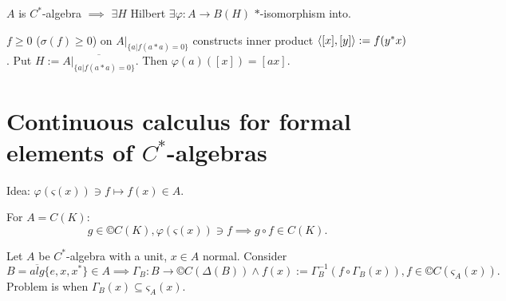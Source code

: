 \documentclass[12pt]{article}					%
\begin{document}
\begin{poznamka}
	$A$ is $C^*$-algebra $\implies$ $\exists H$ Hilbert $\exists φ: A \rightarrow B(H)$ $*$-isomorphism into.

	\begin{dukazin}[Sketch]
		$f ≥ 0$ ($\sigma(f) ≥ 0$) on $A|_{\{a | f(a*a) = 0\}}$ constructs inner product $\left\langle[x], [y]\right\rangle := f(y^* x)$. Put $H := \overline{A|_{\{a | f(a*a) = 0\}}}$. Then $φ(a)([x]) = [a x]$.
	\end{dukazin}
\end{poznamka}

\section{Continuous calculus for formal elements of $C^*$-algebras}
\begin{poznamka}
	Idea: $φ(ς(x)) \ni f \mapsto f(x) \in A$.

	For $A = C(K)$:
	$$ g \in ©C(K), φ(ς(x)) \ni f \implies g \circ f \in C(K). $$

	Let $A$ be $C^*$-algebra with a unit, $x \in A$ normal. Consider
	$$ B = \overline{alg}\{e, x, x^*\} \in A \implies Γ_B: B \rightarrow ©C(Δ(B)) \land f(x) := Γ_B^{-1}(f∘Γ_B (x)), f \in ©C(ς_A(x)). $$
	Problem is when $Γ_B(x) \subseteq ς_A(x)$.
\end{poznamka}
\end{document}

